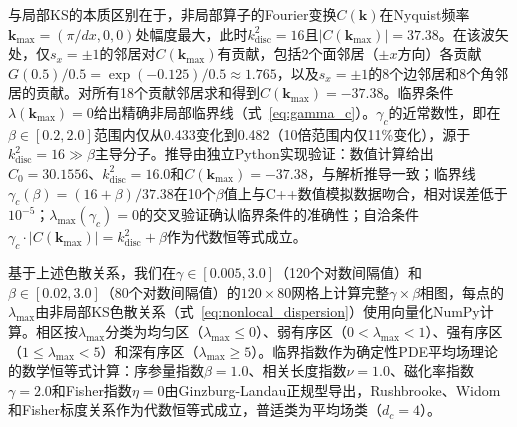 \documentclass[sn-nature,pdflatex]{sn-jnl}
\begin{document}
与局部KS的本质区别在于，非局部算子的Fourier变换$C(\mathbf{k})$在Nyquist频率$\mathbf{k}_{\max} = (\pi/dx, 0, 0)$处幅度最大，此时$k^2_{\text{disc}} = 16$且$|C(\mathbf{k}_{\max})| = 37.38$。在该波矢处，仅$s_x = \pm 1$的邻居对$C(\mathbf{k}_{\max})$有贡献，包括2个面邻居（$\pm x$方向）各贡献$G(0.5)/0.5 = \exp(-0.125)/0.5 \approx 1.765$，以及$s_x = \pm 1$的8个边邻居和8个角邻居的贡献。对所有18个贡献邻居求和得到$C(\mathbf{k}_{\max}) = -37.38$。临界条件$\lambda(\mathbf{k}_{\max}) = 0$给出精确非局部临界线（式~\ref{eq:gamma_c}）。$\gamma_c$的近常数性，即在$\beta \in [0.2, 2.0]$范围内仅从0.433变化到0.482（10倍范围内仅11\%变化），源于$k^2_{\text{disc}} = 16 \gg \beta$主导分子。推导由独立Python实现验证：数值计算给出$C_0 = 30.1556$、$k^2_{\text{disc}} = 16.0$和$C(\mathbf{k}_{\max}) = -37.38$，与解析推导一致；临界线$\gamma_c(\beta) = (16+\beta)/37.38$在10个$\beta$值上与C++数值模拟数据吻合，相对误差低于$10^{-5}$；$\lambda_{\max}(\gamma_c) = 0$的交叉验证确认临界条件的准确性；自洽条件$\gamma_c \cdot |C(\mathbf{k}_{\max})| = k^2_{\text{disc}} + \beta$作为代数恒等式成立。

基于上述色散关系，我们在$\gamma \in [0.005, 3.0]$（120个对数间隔值）和$\beta \in [0.02, 3.0]$（80个对数间隔值）的$120 \times 80$网格上计算完整$\gamma\times\beta$相图，每点的$\lambda_{\max}$由非局部KS色散关系（式~\ref{eq:nonlocal_dispersion}）使用向量化NumPy计算。相区按$\lambda_{\max}$分类为均匀区（$\lambda_{\max} \le 0$）、弱有序区（$0 < \lambda_{\max} < 1$）、强有序区（$1 \le \lambda_{\max} < 5$）和深有序区（$\lambda_{\max} \ge 5$）。临界指数作为确定性PDE平均场理论的数学恒等式计算：序参量指数$\beta = 1.0$、相关长度指数$\nu = 1.0$、磁化率指数$\gamma = 2.0$和Fisher指数$\eta = 0$由Ginzburg-Landau正规型导出，Rushbrooke、Widom和Fisher标度关系作为代数恒等式成立，普适类为平均场类（$d_c = 4$）。
\end{document}
